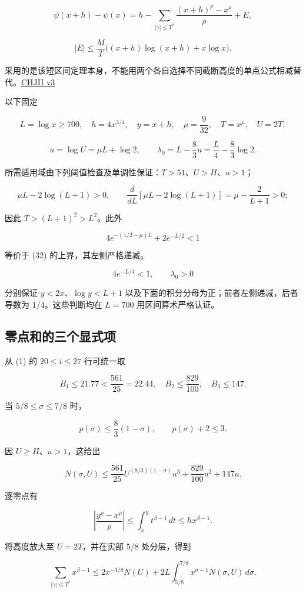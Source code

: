 \documentclass[UTF8,zihao=-4,fontset=fandol]{ctexart}
\begin{document}
\[
\psi(x+h)-\psi(x)
=h-\sum_{|\gamma|\le T^*}\frac{(x+h)^\rho-x^\rho}{\rho}+E,
\]

\[
|E|\le\frac M T\bigl((x+h)\log(x+h)+x\log x\bigr). \tag{33}
\]

采用的是该短区间定理本身，不能用两个各自选择不同截断高度的单点公式相减替代。\href{https://arxiv.org/html/2402.04272v3}{CHJII v3}~\cite{CHJ}

以下固定

\[
L=\log x\ge700,\quad h=4x^{3/4},\quad y=x+h,\quad
\mu=\frac9{32},\quad T=x^\mu,\quad U=2T,
\]

\[
u=\log U=\mu L+\log2,\qquad
\lambda_0=L-\frac83u=\frac L4-\frac83\log2. \tag{34}
\]

所需适用域由下列阈值检查及单调性保证：\(T>51\)、\(U>H\)、\(u>1\)；

\[
\mu L-2\log(L+1)>0,\qquad
\frac d{dL}[\mu L-2\log(L+1)]=\mu-\frac2{L+1}>0;
\]

因此 \(T>(L+1)^2>L^2\)。此外

\[
4e^{-(1/2-\mu)L}+2e^{-L/2}<1 \tag{35}
\]

等价于 (32) 的上界，其左侧严格递减。

\[
4e^{-L/4}<1,\qquad \lambda_0>0
\]

分别保证 \(y<2x\)、\(\log y<L+1\) 以及下面的积分分母为正；前者左侧递减，后者导数为 \(1/4\)。这些判断均在 \(L=700\) 用区间算术严格认证。

\subsection{零点和的三个显式项}

从 (1) 的 \(20\le i\le27\) 行可统一取

\[
B_1\le21.77<\frac{561}{25}=22.44,
\quad B_2\le\frac{829}{100},\quad B_3\le147.
\]

当 \(5/8\le\sigma\le7/8\) 时，

\[
p(\sigma)\le\frac83(1-\sigma),\qquad p(\sigma)+2\le3.
\]

因 \(U\ge H\)、\(u>1\)，这给出

\[
N(\sigma,U)\le\frac{561}{25}U^{(8/3)(1-\sigma)}u^3
+\frac{829}{100}u^2+147u. \tag{36}
\]

逐零点有

\[
\left|\frac{y^\rho-x^\rho}{\rho}\right|
\le\int_x^y t^{\beta-1}\,dt\le h x^{\beta-1}.
\]

将高度放大至 \(U=2T\)，并在实部 \(5/8\) 处分层，得到

\[
\sum_{|\gamma|\le T^*}x^{\beta-1}
\le2x^{-3/8}N(U)
+2L\int_{5/8}^{7/8}x^{\sigma-1}N(\sigma,U)\,d\sigma. \tag{37}
\]
\end{document}
